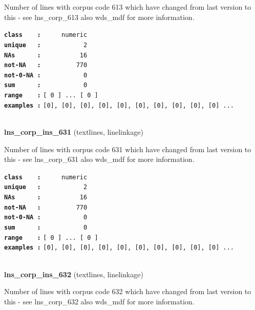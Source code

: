 \documentclass[]{article}
\begin{document}
Number of lines with corpus code 613 which have changed from last
version to this - see lns\_corp\_613 also wds\_mdf for more information.

\textbf{\texttt{class\ \ \ \ :}} \texttt{~~~~~numeric}\\
\textbf{\texttt{unique\ \ \ :}} \texttt{~~~~~~~~~~~2}\\
\textbf{\texttt{NAs\ \ \ \ \ \ :}} \texttt{~~~~~~~~~~16}\\
\textbf{\texttt{not-NA\ \ \ :}} \texttt{~~~~~~~~~770}\\
\textbf{\texttt{not-0-NA\ :}} \texttt{~~~~~~~~~~~0}\\
\textbf{\texttt{sum\ \ \ \ \ \ :}} \texttt{~~~~~~~~~~~0}\\
\textbf{\texttt{range\ \ \ \ :}}
\texttt{{[}\ 0\ {]}\ ...\ {[}\ 0\ {]}}\\
\textbf{\texttt{examples\ :}}
\texttt{{[}0{]},\ {[}0{]},\ {[}0{]},\ {[}0{]},\ {[}0{]},\ {[}0{]},\ {[}0{]},\ {[}0{]},\ {[}0{]},\ {[}0{]}\ ...}\\

~

\textbf{lns\_corp\_ins\_631} (textlines, linelinkage)

Number of lines with corpus code 631 which have changed from last
version to this - see lns\_corp\_631 also wds\_mdf for more information.

\textbf{\texttt{class\ \ \ \ :}} \texttt{~~~~~numeric}\\
\textbf{\texttt{unique\ \ \ :}} \texttt{~~~~~~~~~~~2}\\
\textbf{\texttt{NAs\ \ \ \ \ \ :}} \texttt{~~~~~~~~~~16}\\
\textbf{\texttt{not-NA\ \ \ :}} \texttt{~~~~~~~~~770}\\
\textbf{\texttt{not-0-NA\ :}} \texttt{~~~~~~~~~~~0}\\
\textbf{\texttt{sum\ \ \ \ \ \ :}} \texttt{~~~~~~~~~~~0}\\
\textbf{\texttt{range\ \ \ \ :}}
\texttt{{[}\ 0\ {]}\ ...\ {[}\ 0\ {]}}\\
\textbf{\texttt{examples\ :}}
\texttt{{[}0{]},\ {[}0{]},\ {[}0{]},\ {[}0{]},\ {[}0{]},\ {[}0{]},\ {[}0{]},\ {[}0{]},\ {[}0{]},\ {[}0{]}\ ...}\\

~

\textbf{lns\_corp\_ins\_632} (textlines, linelinkage)

Number of lines with corpus code 632 which have changed from last
version to this - see lns\_corp\_632 also wds\_mdf for more information.
\end{document}
